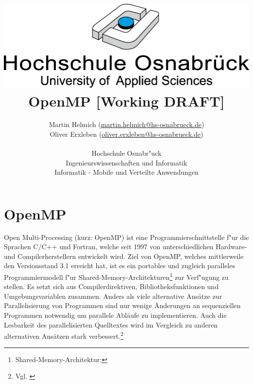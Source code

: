 \documentclass[11pt]{scrartcl}
\begin{document}
\author{%
	Martin Helmich \small(\href{mailto:martin.helmich@hs-osnabrueck.de}{martin.helmich@hs-osnabrueck.de})\\%
	Oliver Erxleben \small(\href{mailto:oliver.erxleben@hs-osnabrueck.de}{oliver.erxleben@hs-osnabrueck.de})\\ \\%
	Hochschule Osnabr"uck \\%
	Ingenieurswissenschaften und Informatik \\%
	Informatik - Mobile und Verteilte Anwendungen }

\title{\includegraphics[scale=0.75,keepaspectratio]{img/hs_os.png}\linebreak \linebreak
OpenMP [Working DRAFT]}

\maketitle
\thispagestyle{empty}
\tableofcontents

\begin{abstract}

\end{abstract}


\pagebreak
\pagestyle{fancy}
\setcounter{page}{1} 

\section{OpenMP} Open Multi-Processing (kurz: OpenMP) ist eine Programmierschnittstelle
f"ur die Sprachen C/C++ und Fortran, welche seit 1997 von unterschiedlichen Hardware- und Compilerherstellern
entwickelt wird. Ziel von OpenMP, welches mittlerweile den Versionsstand 3.1 erreicht hat, ist es ein portables und zugleich paralleles
Programmiermodell f"ur Shared-Memory-Architekturen\footnote{Shared-Memory-Architektur: } zur Verf"ugung zu stellen. Es setzt sich aus Compilerdirektiven, Bibliotheksfunktionen und Umgebungsvariablen zusammen. Anders als viele alternative Ansätze zur Parallelisierung von Programmen sind nur wenige Änderungen an sequenziellen Programmen notwendig um parallele Abläufe zu implementieren. Auch die Lesbarkeit des parallelisierten Quelltextes wird im Vergleich zu anderen alternativen Ansätzen stark verbessert.\footnote{Vgl. \cite{openmp08} }
\end{document}

